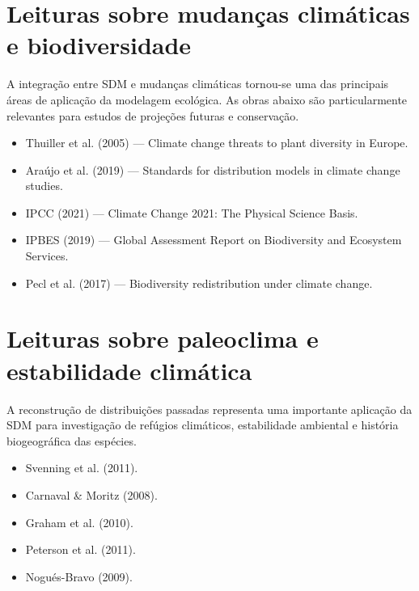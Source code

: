 \section{Leituras sobre mudanças climáticas e biodiversidade}

A integração entre SDM e mudanças climáticas tornou-se uma das principais áreas
de aplicação da modelagem ecológica. As obras abaixo são particularmente
relevantes para estudos de projeções futuras e conservação.

\begin{itemize}
	
	\item Thuiller et al. (2005) --- Climate change threats to plant diversity in Europe.
	
	\item Araújo et al. (2019) --- Standards for distribution models in climate change studies.
	
	\item IPCC (2021) --- Climate Change 2021: The Physical Science Basis.
	
	\item IPBES (2019) --- Global Assessment Report on Biodiversity and Ecosystem Services.
	
	\item Pecl et al. (2017) --- Biodiversity redistribution under climate change.
	
\end{itemize}

\section{Leituras sobre paleoclima e estabilidade climática}

A reconstrução de distribuições passadas representa uma importante aplicação da
SDM para investigação de refúgios climáticos, estabilidade ambiental e
história biogeográfica das espécies.

\begin{itemize}
	
	\item Svenning et al. (2011).
	
	\item Carnaval \& Moritz (2008).
	
	\item Graham et al. (2010).
	
	\item Peterson et al. (2011).
	
	\item Nogués-Bravo (2009).
	
\end{itemize}

